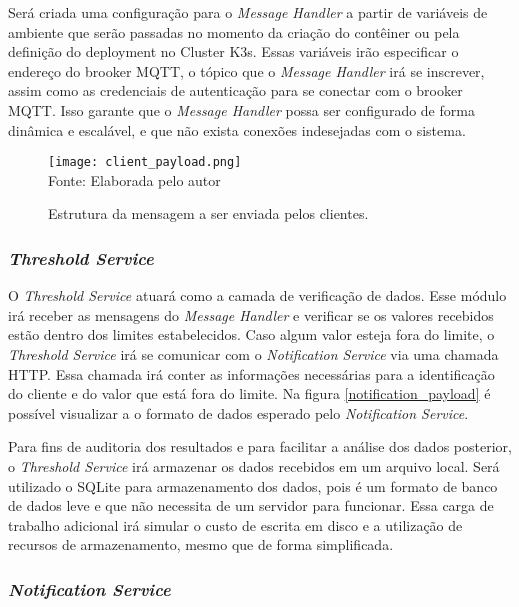 Será criada uma configuração para o \textit{Message Handler} a partir de variáveis de ambiente que serão passadas no momento da criação do contêiner ou pela definição do deployment no Cluster K3s.
Essas variáveis irão especificar o endereço do brooker MQTT, o tópico que o \textit{Message Handler} irá se inscrever, assim como as credenciais de autenticação para se conectar com o brooker MQTT. 
Isso garante que o \textit{Message Handler} possa ser configurado de forma dinâmica e escalável, e que não exista conexões indesejadas com o sistema.

\begin{figure}
    \centering
    \caption{Estrutura da mensagem a ser enviada pelos clientes.}
    \label{client_message}
    \texttt{[image: client\_payload.png]}\\
 Fonte: Elaborada pelo autor
\end{figure}

\subsubsection{\textit{Threshold Service}}

O \textit{Threshold Service} atuará como a camada de verificação de dados. 
Esse módulo irá receber as mensagens do \textit{Message Handler} e verificar se os valores recebidos estão dentro dos limites estabelecidos. 
Caso algum valor esteja fora do limite, o \textit{Threshold Service} irá se comunicar com o \textit{Notification Service} via uma chamada HTTP.
Essa chamada irá conter as informações necessárias para a identificação do cliente e do valor que está fora do limite.
Na figura \ref{notification_payload} é possível visualizar a o formato de dados esperado pelo \textit{Notification Service}.

Para fins de auditoria dos resultados e para facilitar a análise dos dados posterior, o \textit{Threshold Service} irá armazenar os dados recebidos em um arquivo local.
Será utilizado o SQLite para armazenamento dos dados, pois é um formato de banco de dados leve e que não necessita de um servidor para funcionar.
Essa carga de trabalho adicional irá simular o custo de escrita em disco e a utilização de recursos de armazenamento, mesmo que de forma simplificada.


\subsubsection{\textit{Notification Service}}

